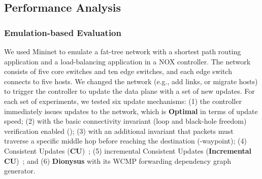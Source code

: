 \subsection{Performance Analysis}
\label{sec:parallel}

\subsubsection{Emulation-based Evaluation}

We used Mininet to emulate a fat-tree network with a shortest path routing application and a load-balancing application in a NOX controller. The network consists of five core switches
and ten edge switches, and each edge switch connects to five hosts. %
We changed the network (e.g., add links, or migrate hosts) to trigger the controller to update the data plane with a set of new updates. 
For each set of experiments, we tested six update mechanisms: (1) the controller immediately issues updates to the network, which is \textbf{Optimal} in terms of update speed; (2) \textbf{\name} with the basic connectivity invariant (loop and black-hole freedom) verification enabled (\name); (3) \name with an additional invariant that packets must traverse a specific middle hop before reaching the destination (\name-waypoint); (4) Consistent Updates (\textbf{CU})~\cite{Reitblatt2012}; (5) incremental Consistent Updates (\textbf{Incremental CU})~\cite{incremental-cu}; and (6) \textbf{Dionysus} \cite{jin2014dynamic} with its WCMP forwarding dependency graph generator.

